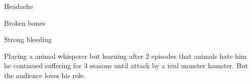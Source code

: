 \begin{npcBox}[title=Theophil Tierlieb]

    \begin{aspects}
    \item {}
    \item {}
    \item {}
    \end{aspects}
    
    \begin{skills}
    \item {}
    \item {}
    \item {}
    \item {}
    \item {}
    \item {}
    \item {}
    \item {}
    \item {}
    \item {}
    \item {}
    \item {}
    \item {}
    \item {}
    \item {}
    \item {}
    \item {}
    \item {}
    \item {}
    \end{skills}
        
    \begin{stressSection}
    \end{stressSection}
    \begin{tabularx}{\textwidth}{ XX }
    \end{tabularx}
    
    \begin{consequences}
    \item {} Headache
    \item {} Broken bones
    \item {} Strong bleeding
    \end{consequences}
    
    \begin{npcDescription}
    Playing a animal whisperer but learning after 2 episodes that animals hate him he continued suffering for 3 seasons until attack by a real monster hamster. But the audience loves his role.
    \end{npcDescription}
    
\end{npcBox}


